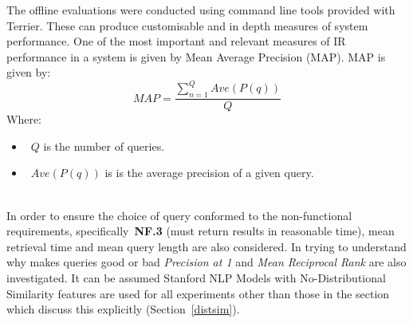 \documentclass{l4proj}
\begin{document}
The offline evaluations were conducted using command line tools provided with Terrier. These can produce customisable and in depth measures of system performance.
One of the most important and relevant measures of IR performance in a system is given by Mean Average Precision (MAP).
MAP is given by:
\begin{displaymath}
  MAP=\frac{\sum_{n=1}^{Q} Ave(P(q))}{Q}
\end{displaymath}
Where: 
\begin{itemize}
\item{~$Q$ is the number of queries.}
\item{~$Ave(P(q))$ is is the average precision of a given query.}
\end{itemize}
\hfill \cite{Manning:2008:IIR:1394399}\\
In order to ensure the choice of query conformed to the non-functional requirements, specifically~\textbf{NF.3} (must return results in reasonable time), mean retrieval time and mean query length are also considered.
In trying to understand why makes queries good or bad \textit{Precision at 1} and \textit{Mean Reciprocal Rank} are also investigated.
It can be assumed Stanford NLP Models with No-Distributional Similarity features are used for all experiments other than those in the section which discuss this explicitly (Section~\ref{distsim}).
\end{document}
